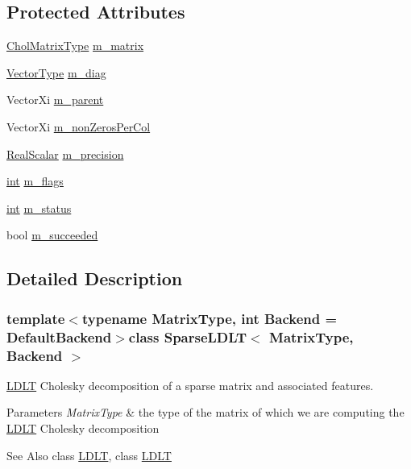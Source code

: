 \subsection*{Protected Attributes}
\begin{DoxyCompactItemize}
\item 
\hyperlink{class_sparse_l_d_l_t_afb27f74b89720bfbe06ab12409bae216}{Chol\-Matrix\-Type} \hyperlink{class_sparse_l_d_l_t_ada2dfc8166ec0fe44e853d12c8f6ee33}{m\-\_\-matrix}
\item 
\hyperlink{class_sparse_l_d_l_t_a33b87d7a821b6945a50cf94417560656}{Vector\-Type} \hyperlink{class_sparse_l_d_l_t_a2cca977f0b187f7f44102c47940979a2}{m\-\_\-diag}
\item 
Vector\-Xi \hyperlink{class_sparse_l_d_l_t_ae4425b946f8df375312e199321fad8bd}{m\-\_\-parent}
\item 
Vector\-Xi \hyperlink{class_sparse_l_d_l_t_a2d8a76968b4baeed0260e3a589a61045}{m\-\_\-non\-Zeros\-Per\-Col}
\item 
\hyperlink{class_sparse_l_d_l_t_a3c48b09bdb95ae052b9d58f592b21913}{Real\-Scalar} \hyperlink{class_sparse_l_d_l_t_a109b6c84b18d97c92a08379d373a7975}{m\-\_\-precision}
\item 
\hyperlink{ioapi_8h_a787fa3cf048117ba7123753c1e74fcd6}{int} \hyperlink{class_sparse_l_d_l_t_a300b26a7575b4c0b08be3a4529a6505f}{m\-\_\-flags}
\item 
\hyperlink{ioapi_8h_a787fa3cf048117ba7123753c1e74fcd6}{int} \hyperlink{class_sparse_l_d_l_t_a4d237375d5b6e0db431f05c373143031}{m\-\_\-status}
\item 
bool \hyperlink{class_sparse_l_d_l_t_a478a3388edfd9e7d7356e311b457ed9f}{m\-\_\-succeeded}
\end{DoxyCompactItemize}


\subsection{Detailed Description}
\subsubsection*{template$<$typename Matrix\-Type, int Backend = Default\-Backend$>$class Sparse\-L\-D\-L\-T$<$ Matrix\-Type, Backend $>$}

\hyperlink{class_l_d_l_t}{L\-D\-L\-T} Cholesky decomposition of a sparse matrix and associated features. 


\begin{DoxyParams}{Parameters}
{\em Matrix\-Type} & the type of the matrix of which we are computing the \hyperlink{class_l_d_l_t}{L\-D\-L\-T} Cholesky decomposition\\
\hline
\end{DoxyParams}
\begin{DoxySeeAlso}{See Also}
class \hyperlink{class_l_d_l_t}{L\-D\-L\-T}, class \hyperlink{class_l_d_l_t}{L\-D\-L\-T} 
\end{DoxySeeAlso}


